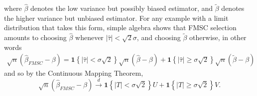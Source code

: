where $\widehat{\beta}$ denotes the low variance but possibly biased estimator, and $\widetilde{\beta}$ denotes the higher variance but unbiased estimator.
For any example with a limit distribution that takes this form, simple algebra shows that FMSC selection amounts to choosing $\widehat{\beta}$ whenever $|\widehat{\tau}|<\sqrt{2}\sigma$, and choosing $\widetilde{\beta}$ otherwise, in other words
\begin{eqnarray*}
  \sqrt{n}(\widehat{\beta}_{FMSC} - \beta) = \mathbf{1}\left\{ |\widehat{\tau}|<\sigma \sqrt{2} \right\} \sqrt{n}(\widehat{\beta} - \beta) +  \mathbf{1}\left\{ |\widehat{\tau}|\geq\sigma \sqrt{2} \right\}\sqrt{n}(\widetilde{\beta} - \beta)
\end{eqnarray*}
and so by the Continuous Mapping Theorem,
\begin{equation}
  \sqrt{n}(\widehat{\beta}_{FMSC} - \beta) \overset{d}{\rightarrow}  \mathbf{1}\left\{ |T|<\sigma \sqrt{2} \right\} U +  \mathbf{1}\left\{ |T|\geq\sigma \sqrt{2} \right\} V.
  \label{eq:FMSCLimitExperiment}
\end{equation}

